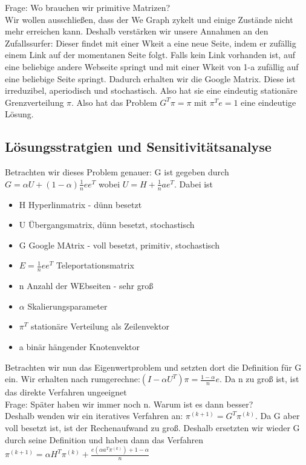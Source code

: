 \documentclass[]{article}
\begin{document}
Frage: Wo brauchen wir primitive Matrizen? \\
  
Wir wollen ausschließen, dass der We Graph zykelt und einige Zustände nicht mehr erreichen kann. Deshalb verstärken wir unsere Annahmen an den Zufallssurfer: Dieser findet mit einer Wkeit a eine neue Seite, indem er zufällig einem Link auf der momentanen Seite folgt. Falls kein Link vorhanden ist, auf eine beliebige andere Webseite springt und mit einer Wkeit von 1-a zufällig auf eine beliebige Seite springt. Dadurch erhalten wir die Google Matrix. Diese ist irreduzibel, aperiodisch und stochastisch. Also hat sie eine eindeutig stationäre Grenzverteilung $\pi$. Also hat das Problem $G^T \pi = \pi$ mit $\pi^Te = 1$ eine eindeutige Lösung.    
 
 \subsection{Lösungsstratgien und Sensitivitätsanalyse}   
 
Betrachten wir dieses Problem genauer: G ist gegeben durch $G= \alpha U + (1 - \alpha ) \frac{1}{n} e e^T$ wobei $U=H+\frac{1}{n}a e^T$. Dabei ist 
\begin{itemize}
	\item H Hyperlinmatrix - dünn besetzt
	\item U Übergangsmatrix, dünn besetzt, stochastisch
	\item G Google MAtrix - voll besetzt, primitiv, stochastisch
	\item $E=\frac{1}{n}ee^T$ Teleportationsmatrix
	\item n Anzahl der WEbseiten - sehr groß
	\item $\alpha$ Skalierungsparameter
	\item $\pi^T$ stationäre Verteilung als Zeilenvektor
	\item a binär hängender Knotenvektor
\end{itemize}

Betrachten wir nun das Eigenwertproblem und setzten dort die Definition für G ein. Wir erhalten nach rumgerechne:$(I- \alpha U^T) \pi = \frac{1 - \alpha}{n}e$. Da n zu groß ist, ist das direkte Verfahren ungeeignet \\

Frage: Später haben wir immer noch n. Warum ist es dann besser? \\

Deshalb wenden wir ein iteratives Verfahren an: $\pi^{(k+1)} = G^T \pi^{(k)}$. Da G aber voll besetzt ist, ist der Rechenaufwand zu groß. Deshalb ersetzten wir wieder G durch seine Definition und haben dann das Verfahren $\pi^{(k+1)}=\alpha H^T \pi^{(k)} + \frac{e(\alpha a^T \pi^{(k)}) + 1 - \alpha}{n}$ 
\end{document}
